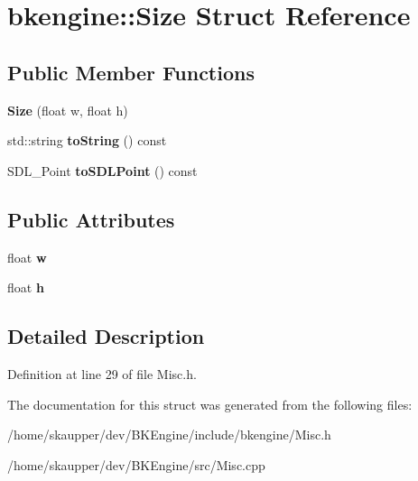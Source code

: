 \hypertarget{structbkengine_1_1Size}{}\section{bkengine\+:\+:Size Struct Reference}
\label{structbkengine_1_1Size}
\subsection*{Public Member Functions}
\begin{DoxyCompactItemize}
\item 
\mbox{\label{structbkengine_1_1Size_a83fc60222fdc4509baacd931f1f2e19f}} 
{\bfseries Size} (float w, float h)
\item 
\mbox{\label{structbkengine_1_1Size_a20d8b4e9f54a2d32f46f4a0bc9fb8bf5}} 
std\+::string {\bfseries to\+String} () const
\item 
\mbox{\label{structbkengine_1_1Size_a855276eef78ff8379cdc357c0f2b35ce}} 
S\+D\+L\+\_\+\+Point {\bfseries to\+S\+D\+L\+Point} () const
\end{DoxyCompactItemize}
\subsection*{Public Attributes}
\begin{DoxyCompactItemize}
\item 
\mbox{\label{structbkengine_1_1Size_a14fb3163bebe1c3f68a3c65c72673230}} 
float {\bfseries w}
\item 
\mbox{\label{structbkengine_1_1Size_acbdb27a32a6c880a071a427892e582d2}} 
float {\bfseries h}
\end{DoxyCompactItemize}


\subsection{Detailed Description}


Definition at line 29 of file Misc.\+h.



The documentation for this struct was generated from the following files\+:\begin{DoxyCompactItemize}
\item 
/home/skaupper/dev/\+B\+K\+Engine/include/bkengine/Misc.\+h\item 
/home/skaupper/dev/\+B\+K\+Engine/src/Misc.\+cpp\end{DoxyCompactItemize}
